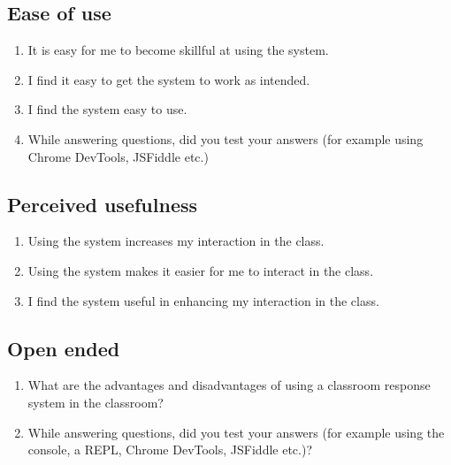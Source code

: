 \subsection{Ease of use}
\begin{enumerate}
    \item It is easy for me to become skillful at using the system.
    \item I find it easy to get the system to work as intended.
    \item I find the system easy to use.
    \item While answering questions, did you test your answers (for example using Chrome DevTools, JSFiddle etc.)
\end{enumerate}

\subsection{Perceived usefulness}
\begin{enumerate}
    \item Using the system increases my interaction in the class.
    \item Using the system makes it easier for me to interact in the class.
    \item I find the system useful in enhancing my interaction in the class.
\end{enumerate}

\subsection{Open ended}\label{app:posttest-open-ended}
\begin{enumerate}
    \item What are the advantages and disadvantages of using a classroom response system in the classroom?
    \item While answering questions, did you test your answers (for example using the console, a REPL, Chrome DevTools, JSFiddle etc.)?
\end{enumerate}